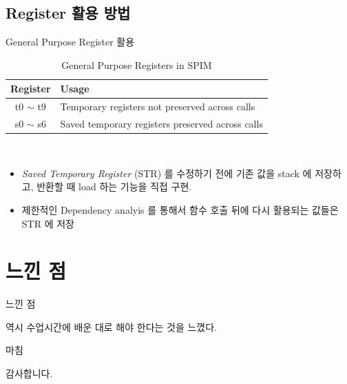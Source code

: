 \documentclass{bredelebeamer}
\begin{document}
\subsection{Register 활용 방법}
\begin{frame}{General Purpose Register 활용}
	\begin{table}
		\centering
		\footnotesize
		\begin{threeparttable}
			\caption{General Purpose Registers in SPIM}
			\begin{tabular}{c|l}
				\toprule
				Register &  Usage \\
				\midrule
				t0 $\sim$ t9 &  Temporary registers not preserved across calls \\
				s0 $\sim$ s6 &  Saved temporary registers preserved across calls \\
				\bottomrule
			\end{tabular}
		\end{threeparttable}\\
	\end{table}
	
	\begin{itemize}
		\item \textit{Saved Temporary Register} (STR) 를 수정하기 전에 기존 값을 stack 에 저장하고, 반환할 때 load 하는 기능을 직접 구현.
		\item 제한적인 Dependency analyis 를 통해서 함수 호출 뒤에 다시 활용되는 값들은 STR 에 저장
	\end{itemize}
\end{frame}

\section{느낀 점}
\begin{frame}{느낀 점}
	\begin{center}
		역시 수업시간에 배운 대로 해야 한다는 것을 느꼈다.
	\end{center}
\end{frame}

\begin{frame}{마침}
  \begin{center}
    감사합니다.
  \end{center}
\end{frame}
\end{document}
